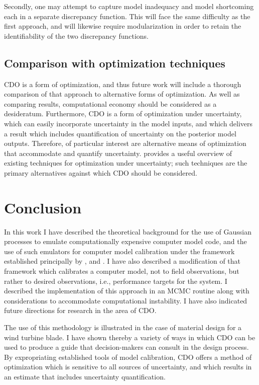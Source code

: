 \documentclass{article}
\begin{document}
Secondly, one may attempt to capture model inadequacy and model shortcoming each in a separate discrepancy function. This will face the same difficulty as the first approach, and will likewise require modularization in order to retain the identifiability of the two discrepancy functions.

\subsection{Comparison with optimization techniques}

CDO is a form of optimization, and thus future work will include a thorough comparison of that approach to alternative forms of optimization. As well as comparing results, computational economy should be considered as a desideratum. Furthermore, CDO is a form of optimization under uncertainty, which can easily incorporate uncertainty in the model inputs, and which delivers a result which includes quantification of uncertainty on the posterior model outputs. Therefore, of particular interest are alternative means of optimization that accommodate and quantify uncertainty. \cite{Sahinidis2004} provides a useful overview of existing techniques for optimization under uncertainty; such techniques are the primary alternatives against which CDO should be considered.

\section{Conclusion}

In this work I have described the theoretical background for the use of Gaussian processes to emulate computationally expensive computer model code, and the use of such emulators for computer model calibration under the framework established principally by \cite{Kennedy2001}, \cite{Williams2006} and \cite{Bayarri2007}. I have also described a modification of that framework which calibrates a computer model, not to field observations, but rather to desired observations, i.e., performance targets for the system. I described the implementation of this approach in an MCMC routine along with considerations to accommodate computational instability. I have also indicated future directions for research in the area of CDO.

The use of this methodology is illustrated in the case of material design for a wind turbine blade. I have shown thereby a variety of ways in which CDO can be used to produce a guide that decision-makers can consult in the design process. By expropriating established tools of model calibration, CDO offers a method of optimization which is sensitive to all sources of uncertainty, and which results in an estimate that includes uncertainty quantification.
\end{document}
